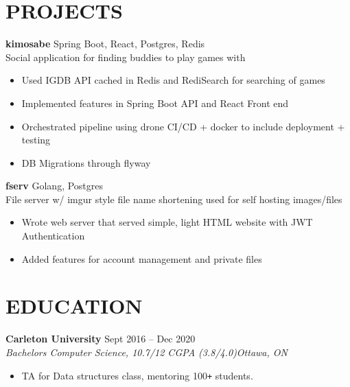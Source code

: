 \documentclass[letterpaper]{article}
\newcommand{\NewPart}[1]{\section*{\large\uppercase{\textbf{#1}}}}
\newcommand{\DatedEntry}[5]{\small\textbf{#1}
	\hfill \small{#2}\\
	\textit{#3}\hfill\textit{#4}\\\vspace{0.1cm}
	#5\vspace{0.1cm}
}
\newcommand{\ProjectEntry}[4]{\textbf{#1}
	\hfill \small{#2}\\
	#3\\\vspace{0.1cm}
	#4\vspace{0.1cm}
}
\begin{document}
\NewPart{Projects}
\ProjectEntry{kimosabe}
{Spring Boot, React, Postgres, Redis}
{Social application for finding buddies to play games with}
{\begin{itemize}
	\item Used IGDB API cached in Redis and RediSearch for searching of games
	\item Implemented features in Spring Boot API and React Front end
	\item Orchestrated pipeline using drone CI/CD + docker to include deployment + testing
	\item DB Migrations through flyway
\end{itemize}}
\ProjectEntry{fserv}
{Golang, Postgres}
{File server w/ imgur style file name shortening used for self hosting images/files}
{\begin{itemize}
	\item Wrote web server that served simple, light HTML website with JWT Authentication
	\item Added features for account management and private files
\end{itemize}}\vspace{-0.3cm}

\NewPart{Education}
\DatedEntry{Carleton University}
{Sept 2016 -- Dec 2020}
{Bachelors Computer Science, 10.7/12 CGPA (3.8/4.0)}
{Ottawa, ON}
{\begin{itemize}
	\item TA for Data structures class, mentoring 100\texttt{+} students.
\end{itemize}}
\end{document}
